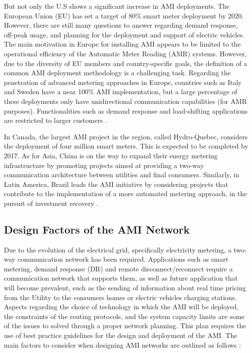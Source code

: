 \documentclass[11pt,draftclsnofoot,onecolumn]{IEEEtran}
\begin{document}
But not only the U.S shows a significant increase in AMI deployments. The European Union (EU) has set a target of 80\% smart meter deployment by 2020. However, there are still many questions to answer regarding demand response, off-peak usage, and planning for the deployment and support of electric vehicles. The main motivation in Europe for installing AMI appears to be limited to the operational efficiency of the Automatic Meter Reading (AMR) systems. However, due to the diversity of EU members and country-specific goals, the definition of a common AMI deployment methodology is a challenging task. Regarding the penetration of advanced metering approaches in Europe, countries such as Italy and Sweden have a near 100\% AMI implementation, but a large percentage of these deployments only have unidirectional communication capabilities (for AMR purposes). Functionalities such as demand response and load-shifting applications are restricted to larger customers \cite{FERC2012}.

In Canada, the largest AMI project in the region, called Hydro-Quebec, considers the deployment of four million smart meters. This is expected to be completed by 2017. As for Asia, China is on the way to expand their energy metering infrastructure by promoting projects aimed at providing a two-way communication architecture between utilities and final consumers. Similarly, in Latin America, Brazil leads the AMI initiative by considering projects that contribute to the implementation of a more automated metering approach, in the pursuit of investment recovery \cite{Namboodiri2012}.


\subsection{Design Factors of the AMI Network}\label{designFactors}

Due to the evolution of the electrical grid, specifically electricity metering, a two-way communication network has been required. Applications such as smart metering, demand response (DR) and remote disconnect/reconnect require a communication network that supports them, as well as future application that will become prevalent, such as the sending of information about real time pricing from the Utility to the consumers homes or electric vehicles charging stations.  
Aspects regarding the choice of technology in which the AMI will be deployed, the constraints of the routing protocols, and the system capacity limits are some of the issues to solved through a proper network planning. This plan requires the use of best practice guidelines for the design and deployment of the AMI. The main factors to consider when designing AMI networks are outlined as follows \cite{Leon2011}:
\end{document}
